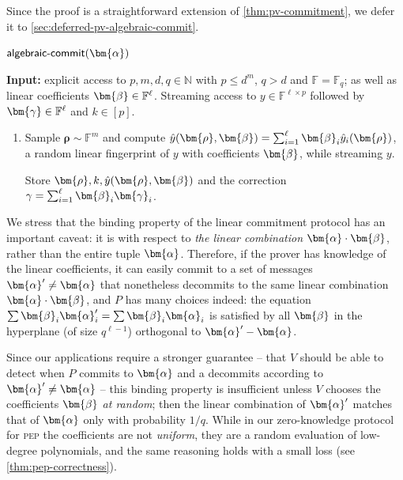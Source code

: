 \documentclass[10pt,a4paper]{article}
\newif\iflipics\lipicsfalse
\theoremstyle{definition}
\newcommand{\N}{\mathbb N}
\newcommand{\field}{\mathbb{F}}
\newcommand{\pep}{\normalfont\textsc{pep}\xspace}
\newcommand{\pcommitlength}{p}
\newcommand{\pcommitstring}{y}
\newcommand{\dimension}{m}
\newcommand{\degree}{d}
\newcommand{\fieldsize}{q}
\newcommand{\evaluationpoint}{\bm{\fe2}}
\newcommand{\fingerprinttuple}{\bm{\rho}}
\def\fe#1{
    \ifnum#1=1
        \alpha
    \else
    \ifnum#1=2
        \beta
    \else
    \ifnum#1=3
        \gamma
    \fi\fi\fi
}
\begin{document}
Since the proof is a straightforward extension of \cref{thm:pv-commitment}, we defer it to \cref{sec:deferred-pv-algebraic-commit}.

\iflipics
\begin{figure}
\else
\begin{protocol}[label={prot:algebraic-commit}]{$\textsf{algebraic-commit}(\bm{\fe1})$}
\fi
    \textbf{Input:} explicit access to $\pcommitlength, \dimension, \degree, \fieldsize \in \N$ with $\pcommitlength \leq \degree^\dimension$, $\fieldsize > \degree$ and $\field = \field_\fieldsize$; as well as linear coefficients $\evaluationpoint \in \field^\ell$. Streaming access to $\pcommitstring \in \field^{\ell \times \pcommitlength}$ followed by $\bm{\fe3} \in \field^\ell$ and $k \in [\pcommitlength]$.
    
	\begin{enumerate}[label={}]
	    \item[$\bm V$:] Sample $\fingerprinttuple \sim \field^\dimension$ and compute $\hat \pcommitstring(\fingerprinttuple, \evaluationpoint) = \sum_{i = 1}^\ell \evaluationpoint_i \hat \pcommitstring_i(\fingerprinttuple)$, a random linear fingerprint of $\pcommitstring$ with coefficients $\evaluationpoint$, while streaming $\pcommitstring$.
	    
	    Store $\fingerprinttuple, k, \hat \pcommitstring(\fingerprinttuple, \evaluationpoint)$ and the correction $\fe3 = \sum_{i = 1}^\ell \evaluationpoint_i \bm{\fe3}_i$.
	\end{enumerate}
\iflipics
\caption{Protocol $\textsf{algebraic-commit}(\bm{\fe1})$}
\label{prot:algebraic-commit}
\end{figure}
\else
\end{protocol}
\fi

We stress that the binding property of the linear commitment protocol has an important caveat: it is with respect to \emph{the linear combination} $\bm{\fe1} \cdot \bm{\fe2}$, rather than the entire tuple $\bm{\fe1}$. Therefore, if the prover has knowledge of the linear coefficients, it can easily commit to a set of messages $\bm{\fe1}' \neq \bm{\fe1}$ that nonetheless decommits to the same linear combination $\bm{\fe1} \cdot \evaluationpoint$, and $P$ has many choices indeed: the equation $\sum \evaluationpoint_i \bm{\fe1}_i' =  \sum \evaluationpoint_i \bm{\fe1}_i$ is satisfied by all $\evaluationpoint$ in the hyperplane (of size $\fieldsize^{\ell - 1}$) orthogonal to $\bm{\fe1}' - \bm{\fe1}$.

Since our applications require a stronger guarantee -- that $V$ should be able to detect when $P$ commits to $\bm{\fe1}$ and a decommits according to $\bm{\fe1}' \neq \bm{\fe1}$ -- this binding property is insufficient unless $V$ chooses the coefficients $\bm{\fe2}$ \emph{at random}; then the linear combination of $\bm{\fe1}'$ matches that of $\bm{\fe1}$ only with probability $1/\fieldsize$. While in our zero-knowledge protocol for \pep the coefficients are not \emph{uniform}, they are a random evaluation of low-degree polynomials, and the same reasoning holds with a small loss (see \cref{thm:pep-correctness}).
\end{document}
